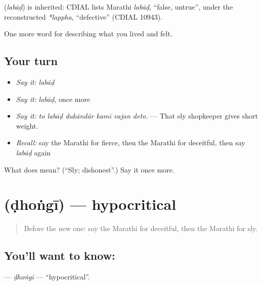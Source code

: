 \begin{cousinweb}
\textbf{} (\emph{labāḍ}) is inherited: CDIAL lists Marathi \emph{labāḍ}, \textquotedblleft{}false, untrue\textquotedblright{}, under the reconstructed \emph{*lappha}, \textquotedblleft{}defective\textquotedblright{} (CDIAL 10943).
\end{cousinweb}

\begin{grammarlens}[title={What you've built}]
One more word for describing what you lived and felt.
\end{grammarlens}

\subsection*{Your turn}
\begin{itemize}
\raggedright
  \item \emph{Say it:} \emph{labāḍ}
  \item \emph{Say it:} \emph{labāḍ}, once more
  \item \emph{Say it:} \emph{to labāḍ dukāndār kamī vajan deto.} — That sly shopkeeper gives short weight.
  \item \emph{Recall:} say the Marathi for fierce, then the Marathi for deceitful, then say \emph{labāḍ} again
\end{itemize}

\begin{tcolorbox}[breakable,colback=teal!4,colframe=teal!35!black,title={Before you move on}]
What does  mean? (\textquotedblleft{}Sly; dishonest\textquotedblright{}.) Say it once more.
\end{tcolorbox}
\section[\texorpdfstring{\mr{ढोंगी} (ḍhoṅgī)}{ढोंगी (ḍhoṅgī)}]{ (ḍhoṅgī) — hypocritical}

\label{lesson:MR-C470-dhongi}



\begin{quote}
Before the new one: say the Marathi for deceitful, then the Marathi for sly.
\end{quote}

\subsection*{You'll want to know: }
\textbf{} — \emph{ḍhoṅgī} — \textquotedblleft{}hypocritical\textquotedblright{}.

